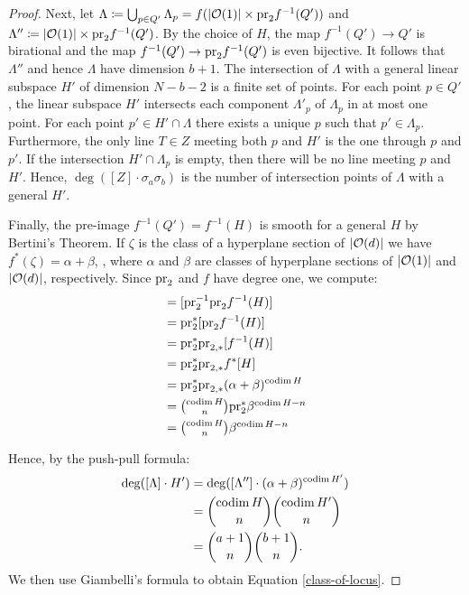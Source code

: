 \begin{proof}
	Next, let $\Lambda \coloneqq \bigcup_{p\in Q'} \Lambda_p = f(\lvert\mathcal{O}(1)\rvert\times \mathrm{pr}_2 f^{-1}(Q'))$ and $\Lambda''\coloneqq \lvert\mathcal{O}(1)\rvert\times \mathrm{pr}_2 f^{-1}(Q')$. By the choice of $H$, the map $f^{-1}(Q')\to Q'$ is birational and the map $f^{-1}(Q')\to \mathrm{pr}_2f^{-1}(Q')$ is even bijective. It follows that $\Lambda''$ and hence $\Lambda$ have dimension $b+1$. The intersection of $\Lambda$ with a general linear subspace $H'$ of dimension $N-b-2$ is a finite set of points. For each point $p\in Q'$, the linear subspace $H'$ intersects each component $\Lambda'_p$ of $\Lambda_p$ in at most one point. For each point $p'\in H'\cap\Lambda$ there exists a unique $p$ such that $p'\in\Lambda_p$. Furthermore, the only line $T\in Z$ meeting both $p$ and $H'$ is the one through $p$ and $p'$. If the intersection $H'\cap \Lambda_p$ is empty, then there will be no line meeting $p$ and $H'$. Hence, $\deg([Z]\cdot \sigma_{a}\sigma_{b})$ is the number of intersection points of $\Lambda$ with a general $H'$.

	Finally, the pre-image $f^{-1}(Q') = f^{-1}(H)$ is smooth for a general $H$ by Bertini's Theorem. If $\zeta$ is the class of a hyperplane section of $\lvert\mathcal{O}(d)\rvert$ we have $f^*(\zeta) = \alpha + \beta$, , where $\alpha$ and $\beta$ are classes of hyperplane sections of $\lvert\mathcal{O}(1)\rvert$ and $\lvert\mathcal{O}(d)\rvert$, respectively. Since $\mathrm{pr}_2$ and $f$ have degree one, we compute:
	\begin{align*}
	[\Lambda''] & = [\pr_2^{-1}\pr_2 f^{-1}(H)] \\
	& = \pr_2^*[\pr_2 f^{-1}(H)] \\
	& = \pr_2^* \pr_{2,*}[f^{-1}(H)] \\
	& = \pr_2^*\pr_{2,*}f^*[H] \\
	& = \pr_2^* \pr_{2,*}(\alpha + \beta)^{\codim H} \\
	& = \textstyle{\binom{\codim H}{n}}\pr_2^* \beta^{\codim H -n} \\
	& = \textstyle{\binom{\codim H}{n}}\beta^{\codim H -n}
	\end{align*}

	Hence, by the push-pull formula:
	\begin{align*}
		\deg([\Lambda]\cdot H') &= \deg([\Lambda'']\cdot(\alpha+\beta)^{\operatorname{codim} H'}) \\ &= \binom{\operatorname{codim} H}{n}\binom{\operatorname{codim} H'}{n}
		\\ &=\binom{a+1}{n}\binom{b+1}{n}.
	\end{align*}
	We then use Giambelli's formula to obtain Equation \cref{class-of-locus}.


\end{proof}
